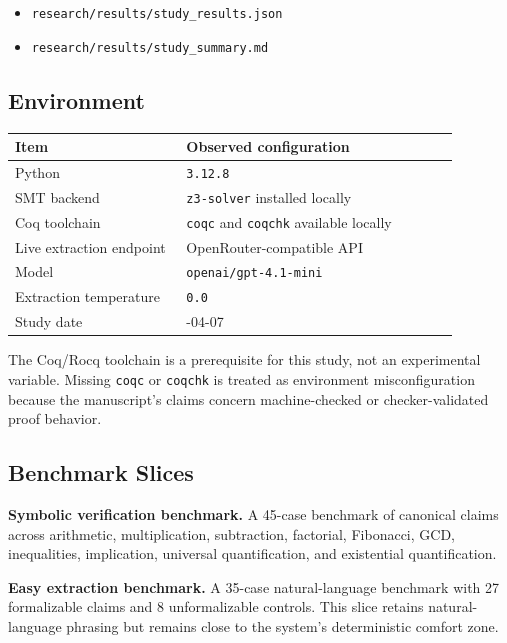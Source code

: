 \documentclass[11pt]{article}
\begin{document}
\begin{itemize}
  \item \nolinkurl{research/results/study_results.json}
  \item \nolinkurl{research/results/study_summary.md}
\end{itemize}

\subsection{Environment}

\begin{longtable}{>{\raggedright\arraybackslash}p{0.34\linewidth} >{\raggedright\arraybackslash}p{0.54\linewidth}}
\toprule
\textbf{Item} & \textbf{Observed configuration} \\
\midrule
Python & \texttt{3.12.8} \\
SMT backend & \texttt{z3-solver} installed locally \\
Coq toolchain & \texttt{coqc} and \texttt{coqchk} available locally \\
Live extraction endpoint & OpenRouter-compatible API \\
Model & \texttt{openai/gpt-4.1-mini} \\
Extraction temperature & \texttt{0.0} \\
Study date & 2026-04-07 \\
\bottomrule
\end{longtable}

The Coq/Rocq toolchain is a prerequisite for this study, not an experimental
variable. Missing \texttt{coqc} or \texttt{coqchk} is treated as environment
misconfiguration because the manuscript's claims concern machine-checked or
checker-validated proof behavior.

\subsection{Benchmark Slices}

\textbf{Symbolic verification benchmark.} A 45-case benchmark of canonical
claims across arithmetic, multiplication, subtraction, factorial, Fibonacci,
GCD, inequalities, implication, universal quantification, and existential
quantification.

\textbf{Easy extraction benchmark.} A 35-case natural-language benchmark with
27 formalizable claims and 8 unformalizable controls. This slice retains
natural-language phrasing but remains close to the system's deterministic
comfort zone.
\end{document}
